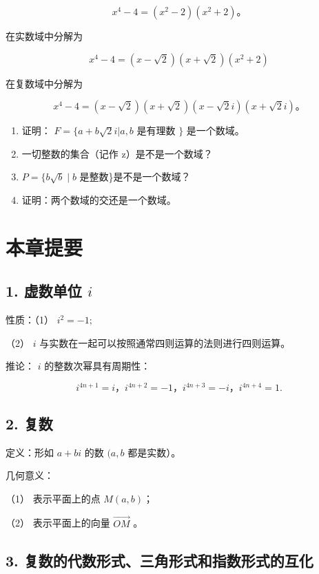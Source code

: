 \[
x ^ {4} - 4 = (x ^ {2} - 2) (x ^ {2} + 2)\text{。}
\]

在实数域中分解为

\[
x ^ {4} - 4 = (x - \sqrt {2}) (x + \sqrt {2}) (x ^ {2} + 2)
\]

在复数域中分解为

\[
x ^ {4} - 4 = (x - \sqrt {2}) (x + \sqrt {2}) (x - \sqrt {2} i) (x + \sqrt {2} i)\text{。}
\]

\begin{enumerate}
\item
  证明： \(F=\{a+b\sqrt{2}i|a,b\) 是有理数 \(\}\) 是一个数域。
\item
  一切整数的集合（记作 z）是不是一个数域？
\item
  \(P = \{b\sqrt{b} \mid b\) 是整数\}是不是一个数域？
\item
  证明：两个数域的交还是一个数域。
\end{enumerate}

\section{本章提要}

\subsection{\texorpdfstring{1. 虚数单位 \(i\)}{1. 虚数单位 i}}

性质：（1） \(i^{2}=-1;\)

（2） \(i\) 与实数在一起可以按照通常四则运算的法则进行四则运算。

推论： \(i\) 的整数次幂具有周期性：

\[
i ^ {4 n + 1} = i\text{，} i ^ {4 n + 2} = - 1\text{，} i ^ {4 n + 3} = - i\text{，} i ^ {4 n + 4} = 1.
\]

\subsection{2. 复数}

定义：形如 \(a+bi\) 的数 \((a,b\) 都是实数）。

几何意义：

（1） 表示平面上的点 \(M(a, b)\)；

（2） 表示平面上的向量 \(\overrightarrow{OM}\) 。

\subsection{3. 复数的代数形式、三角形式和指数形式的互化}

